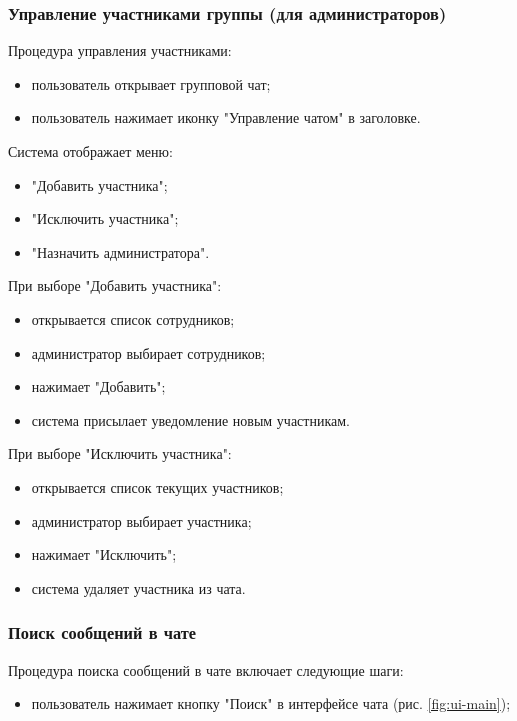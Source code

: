 \subsubsection{Управление участниками группы (для администраторов)}  
Процедура управления участниками:  
\begin{itemize}  
	\item пользователь открывает групповой чат;  
	\item пользователь нажимает иконку "Управление чатом" в заголовке.  
\end{itemize}

Система отображает меню:

\begin{itemize}  
	\item "Добавить участника";  
	\item "Исключить участника";  
	\item "Назначить администратора".  
\end{itemize}

При выборе "Добавить участника":  

\begin{itemize}
	\item открывается список сотрудников;  
	\item администратор выбирает сотрудников;  
	\item нажимает "Добавить";  
	\item система присылает уведомление новым участникам.
\end{itemize}

При выборе "Исключить участника":  

\begin{itemize}
	\item открывается список текущих участников;  
	\item администратор выбирает участника;  
	\item нажимает "Исключить";  
	\item система удаляет участника из чата.  
\end{itemize}

\subsubsection{Поиск сообщений в чате}
Процедура поиска сообщений в чате включает следующие шаги:

\begin{itemize}
	\item пользователь нажимает кнопку "Поиск" в интерфейсе чата (рис. \ref{fig:ui-main});
\end{itemize}

